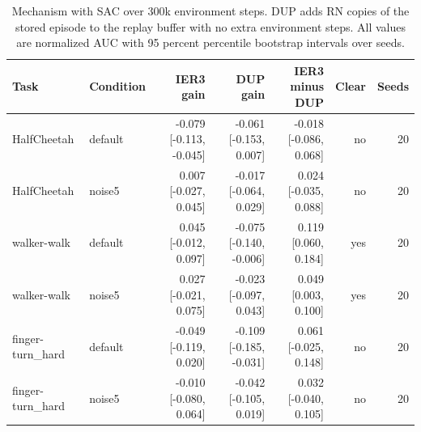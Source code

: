 \begin{table}[t]
\centering
\small
\begin{tabular}{llrrrrr}
\toprule
Task & Condition & IER3 gain & DUP gain & IER3 minus DUP & Clear & Seeds \\
\midrule
HalfCheetah & default & -0.079 [-0.113, -0.045] & -0.061 [-0.153, 0.007] & -0.018 [-0.086, 0.068] & no & 20 \\
HalfCheetah & noise5 & 0.007 [-0.027, 0.045] & -0.017 [-0.064, 0.029] & 0.024 [-0.035, 0.088] & no & 20 \\
walker-walk & default & 0.045 [-0.012, 0.097] & -0.075 [-0.140, -0.006] & 0.119 [0.060, 0.184] & yes & 20 \\
walker-walk & noise5 & 0.027 [-0.021, 0.075] & -0.023 [-0.097, 0.043] & 0.049 [0.003, 0.100] & yes & 20 \\
finger-turn\_hard & default & -0.049 [-0.119, 0.020] & -0.109 [-0.185, -0.031] & 0.061 [-0.025, 0.148] & no & 20 \\
finger-turn\_hard & noise5 & -0.010 [-0.080, 0.064] & -0.042 [-0.105, 0.019] & 0.032 [-0.040, 0.105] & no & 20 \\
\bottomrule
\end{tabular}
\caption{Mechanism with SAC over 300k environment steps. DUP adds RN copies of the stored episode to the replay buffer with no extra environment steps. All values are normalized AUC with 95 percent percentile bootstrap intervals over seeds.}
\label{tab:mechanism}
\end{table}
